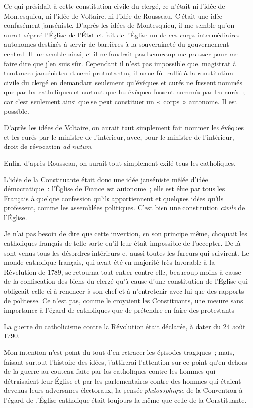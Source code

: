 \documentclass[french,twoside]{book} %
\begin{document}
Ce qui présidait à cette constitution civile du clergé, ce n’était ni l’idée de Montesquieu, ni l’idée de Voltaire, ni l’idée de Rousseau. C’était une idée confusément janséniste. D’après les idées de Montesquieu, il me semble qu’on aurait séparé l’Église de l’État et fait de l’Église un de ces corps intermédiaires autonomes destinés à servir de barrières à la souveraineté du gouvernement central. Il me semble ainsi, et il ne faudrait pas beaucoup me pousser pour me faire dire que j’en suis sûr. Cependant il n’est pas impossible que, magistrat à tendances jansénistes et semi-protestantes, il ne se fût rallié à la constitution civile du clergé en demandant seulement qu’évêques et curés ne fussent nommés que par les catholiques et surtout que les évêques fussent nommés par les curés ; car c’est seulement ainsi que se peut constituer un « corps » autonome. Il est possible.\par
 D’après les idées de Voltaire, on aurait tout simplement fait nommer les évêques et les curés par le ministre de l’intérieur, avec, pour le ministre de l’intérieur, droit de révocation {\itshape ad nutum}.\par
Enfin, d’après Rousseau, on aurait tout simplement exilé tous les catholiques.\par
L’idée de la Constituante était donc une idée janséniste mêlée d’idée démocratique : l’Église de France est autonome ; elle est élue par tous les Français à quelque confession qu’ils appartiennent et quelques idées qu’ils professent, comme les assemblées politiques. C’est bien une constitution {\itshape civile} de l’Église.\par
Je n’ai pas besoin de dire que cette invention, en son principe même, choquait les catholiques français de telle sorte qu’il leur était impossible de l’accepter. De là sont venus tous les désordres intérieurs et aussi toutes les fureurs qui suivirent. Le monde catholique français, qui avait été en majorité très favorable à la Révolution de 1789, se retourna tout entier contre elle, beaucoup moins à cause de la confiscation des biens du clergé qu’à cause d’une constitution de l’Église qui obligeait celle-ci à renoncer à son chef et à n’entretenir avec lui que des rapports de politesse. Ce n’est pas, comme le croyaient les Constituants, une mesure  sans importance à l’égard de catholiques que de prétendre en faire des protestants.\par
La guerre du catholicisme contre la Révolution était déclarée, à dater du 24 août 1790.\par
Mon intention n’est point du tout d’en retracer les épisodes tragiques ; mais, faisant surtout l’histoire des idées, j’attirerai l’attention sur ce point qu’en dehors de la guerre au couteau faite par les catholiques contre les hommes qui détruisaient leur Église et par les parlementaires contre des hommes qui étaient devenus leurs adversaires électoraux, la pensée {\itshape philosophique} de la Convention à l’égard de l’Église catholique était toujours la même que celle de la Constituante.\par
\end{document}
